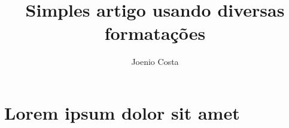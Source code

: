 \documentclass{article}
\begin{document}
\title{Simples artigo usando diversas formatações}

\author{Joenio Costa}

\maketitle

\tableofcontents
\listoffigures
\listoftables

\section{Lorem ipsum dolor sit amet}
\end{document}
